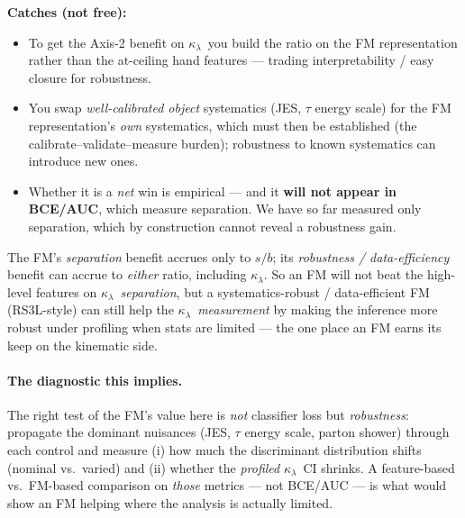 \documentclass[11pt]{article}
\newcommand{\kl}{\ensuremath{\kappa_\lambda}}
\begin{document}
\noindent\textbf{Catches (not free):}
\begin{itemize}
\item To get the Axis-2 benefit on \kl\ you build the ratio on the FM representation
  rather than the at-ceiling hand features --- trading interpretability / easy closure
  for robustness.
\item You swap \emph{well-calibrated object} systematics (JES, $\tau$ energy scale) for
  the FM representation's \emph{own} systematics, which must then be established (the
  calibrate--validate--measure burden); robustness to known systematics can introduce
  new ones.
\item Whether it is a \emph{net} win is empirical --- and it \textbf{will not appear in
  BCE/AUC}, which measure separation. We have so far measured only separation, which by
  construction cannot reveal a robustness gain.
\end{itemize}

\begin{takeaway}
The FM's \emph{separation} benefit accrues only to $s/b$; its \emph{robustness /
data-efficiency} benefit can accrue to \emph{either} ratio, including \kl. So an FM will
not beat the high-level features on \kl\ \emph{separation}, but a systematics-robust /
data-efficient FM (RS3L-style) can still help the \kl\ \emph{measurement} by making the
inference more robust under profiling when stats are limited --- the one place an FM
earns its keep on the kinematic side.
\end{takeaway}

\paragraph{The diagnostic this implies.} The right test of the FM's value here is
\emph{not} classifier loss but \emph{robustness}: propagate the dominant nuisances
(JES, $\tau$ energy scale, parton shower) through each control and measure (i) how much
the discriminant distribution shifts (nominal vs.\ varied) and (ii) whether the
\emph{profiled} \kl\ CI shrinks. A feature-based vs.\ FM-based comparison on \emph{those}
metrics --- not BCE/AUC --- is what would show an FM helping where the analysis is
actually limited.
\end{document}

